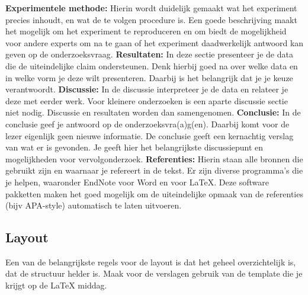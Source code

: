 %
\textbf{Experimentele methode:} Hierin wordt duidelijk gemaakt wat het experiment precies inhoudt, en wat de te volgen procedure is. Een goede beschrijving maakt het mogelijk om het experiment te reproduceren en om biedt de mogelijkheid voor andere experts om na te gaan of het experiment daadwerkelijk antwoord kan geven op de onderzoeksvraag.\newline\newline
%
\textbf{Resultaten:} In deze sectie presenteer je de data die de uiteindelijke claim ondersteunen. Denk hierbij goed na over welke data en in welke vorm je deze wilt presenteren. Daarbij is het belangrijk dat je je keuze verantwoordt.\newline\newline
%
\textbf{Discussie:} In de discussie interpreteer je de data en relateer je deze met eerder werk. Voor kleinere onderzoeken is een aparte discussie sectie niet nodig. Discussie en resultaten worden dan samengenomen.\newline\newline
%
\textbf{Conclusie:} In de conclusie geef je antwoord op de onderzoeksvra(a)g(en). Daarbij komt voor de lezer eigenlijk geen nieuwe informatie. De conclusie geeft een kernachtig verslag van wat er is gevonden. Je geeft hier het belangrijkste discussiepunt en mogelijkheden voor vervolgonderzoek.\newline\newline
%
\textbf{Referenties:} Hierin staan alle bronnen die gebruikt zijn en waarnaar je refereert in de tekst. Er zijn diverse programma’s die je helpen, waaronder EndNote voor Word en voor LaTeX. Deze software pakketten maken het goed mogelijk om de uiteindelijke opmaak van de referenties (bijv APA-style) automatisch te laten uitvoeren.\newline\newline
%
\subsection{Layout}
Een van de belangrijkste regels voor de layout is dat het geheel overzichtelijk is, dat de structuur helder is. Maak voor de verslagen gebruik van de template die je krijgt op de LaTeX middag. 
%
